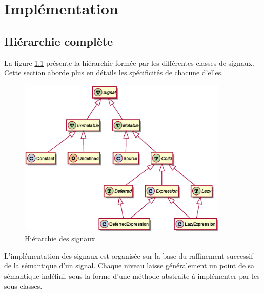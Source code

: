 \section{Implémentation}

\subsection{Hiérarchie complète}
\label{sec:sig-hierarchy}

La figure \ref{sec:sig-hierarchy} présente la hiérarchie formée par les différentes classes de signaux. Cette section aborde plus en détails les spécificités de chacune d'elles.

\begin{figure}[h]
	\centering
	\includegraphics[width=10cm]{img/sig_hierarchy.eps}
	\caption{Hiérarchie des signaux}
	\label{fig:sig-hierarchy}
\end{figure}

L'implémentation des signaux est organisée sur la base du raffinement successif de la sémantique d'un signal. Chaque niveau laisse généralement un point de sa sémantique indéfini, sous la forme d'une méthode abstraite à implémenter par les sous-classes.

